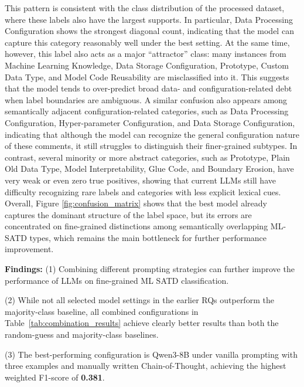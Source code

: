 \documentclass[acmsmall,screen,review,anonymous]{acmart}
\begin{document}
This pattern is consistent with the class distribution of the processed dataset, where these labels also have the largest supports. In particular, Data Processing Configuration shows the strongest diagonal count, indicating that the model can capture this category reasonably well under the best setting. At the same time, however, this label also acts as a major “attractor” class: many instances from Machine Learning Knowledge, Data Storage Configuration, Prototype, Custom Data Type, and Model Code Reusability are misclassified into it. This suggests that the model tends to over-predict broad data- and configuration-related debt when label boundaries are ambiguous. A similar confusion also appears among semantically adjacent configuration-related categories, such as Data Processing Configuration, Hyper-parameter Configuration, and Data Storage Configuration, indicating that although the model can recognize the general configuration nature of these comments, it still struggles to distinguish their finer-grained subtypes. In contrast, several minority or more abstract categories, such as Prototype, Plain Old Data Type, Model Interpretability, Glue Code, and Boundary Erosion, have very weak or even zero true positives, showing that current LLMs still have difficulty recognizing rare labels and categories with less explicit lexical cues. Overall, Figure \ref{fig:confusion_matrix} shows that the best model already captures the dominant structure of the label space, but its errors are concentrated on fine-grained distinctions among semantically overlapping ML-SATD types, which remains the main bottleneck for further performance improvement.

\begin{boxB}
\textbf{Findings:} (1) Combining different prompting strategies can further improve the performance of LLMs on fine-grained ML SATD classification.

(2) While not all selected model settings in the earlier RQs outperform the majority-class baseline, all combined configurations in Table~\ref{tab:combination_results} achieve clearly better results than both the random-guess and majority-class baselines.

(3) The best-performing configuration is Qwen3-8B under vanilla prompting with three examples and manually written Chain-of-Thought, achieving the highest weighted F1-score of \textbf{0.381}.
\end{boxB}
\end{document}
